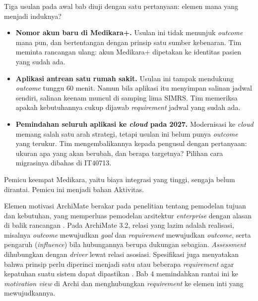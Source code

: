 \begin{kasus}[title={Kasus Medikara Health: Menguji Tiga Usulan dengan Rantai Motivasi}]
  Tiga usulan pada awal bab diuji dengan satu pertanyaan: elemen mana yang
  menjadi induknya?

  \begin{itemize}
    \item \textbf{Nomor akun baru di Medikara+.} Usulan ini tidak menunjuk
          \textit{outcome} mana pun, dan bertentangan dengan prinsip satu sumber
          kebenaran. Tim meminta rancangan ulang: akun Medikara+ dipetakan ke
          identitas pasien yang sudah ada.
    \item \textbf{Aplikasi antrean satu rumah sakit.} Usulan ini tampak mendukung
          \textit{outcome} tunggu 60 menit. Namun bila aplikasi itu menyimpan
          salinan jadwal sendiri, salinan keenam muncul di samping lima SIMRS.
          Tim memeriksa apakah kebutuhannya cukup dijawab \textit{requirement}
          jadwal yang sudah ada.
    \item \textbf{Pemindahan seluruh aplikasi ke \textit{cloud} pada 2027.}
          Modernisasi ke \textit{cloud} memang salah satu arah strategi, tetapi
          usulan ini belum punya \textit{outcome} yang terukur. Tim mengembalikannya kepada
          pengusul dengan pertanyaan: ukuran apa yang akan berubah, dan berapa
          targetnya? Pilihan cara migrasinya dibahas di IT40713.
  \end{itemize}

  Pemicu keempat Medikara, yaitu biaya integrasi yang tinggi, sengaja belum
  dirantai. Pemicu ini menjadi bahan Aktivitas.
\end{kasus}

\begin{pendalaman}[title={Pendalaman Teknis (opsional): Elemen Motivasi di ArchiMate}]
  Elemen motivasi ArchiMate berakar pada penelitian tentang pemodelan tujuan dan
  kebutuhan, yang memperluas pemodelan arsitektur \textit{enterprise} dengan
  alasan di balik rancangan \cite{c03-engelsman2011}. Pada ArchiMate 3.2, relasi
  yang lazim adalah realisasi, misalnya \textit{outcome} mewujudkan \textit{goal}
  dan \textit{requirement} mewujudkan \textit{outcome}, serta pengaruh
  (\textit{influence}) bila hubungannya berupa dukungan sebagian.
  \textit{Assessment} dihubungkan dengan \textit{driver} lewat relasi asosiasi.
  Spesifikasi juga menyatakan bahwa prinsip perlu diperinci menjadi satu atau
  beberapa \textit{requirement} agar kepatuhan suatu sistem dapat dipastikan
  \cite{archimate32}. Bab 4 memindahkan rantai ini ke \textit{motivation view} di
  Archi dan menghubungkan \textit{requirement} ke elemen inti yang mewujudkannya.
\end{pendalaman}

